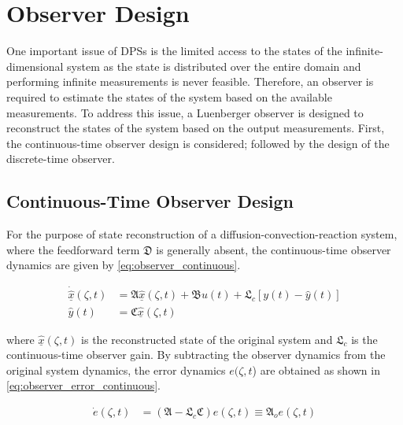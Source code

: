 \section{Observer Design}

One important issue of DPSs is the limited access to the states of the infinite-dimensional system as the state is distributed over the entire domain and performing infinite measurements is never feasible. Therefore, an observer is required to estimate the states of the system based on the available measurements. To address this issue, a Luenberger observer is designed to reconstruct the states of the system based on the output measurements. First, the continuous-time observer design is considered; followed by the design of the discrete-time observer.

\subsection{Continuous-Time Observer Design}

For the purpose of state reconstruction of a diffusion-convection-reaction system, where the feedforward term $\mathfrak{D}$ is generally absent, the continuous-time observer dynamics are given by \eqref{eq:observer_continuous}.

\begin{equation} \label{eq:observer_continuous}
    \begin{aligned}
        \dot{\underline{\hat{x}}}(\zeta, t) &= \mathfrak{A} \underline{\hat{x}}(\zeta, t) + \mathfrak{B} u(t) + \mathfrak{L}_c [y(t) - \hat{y}(t)] \\
        \hat{y}(t) &= \mathfrak{C} \underline{\hat{x}}(\zeta, t)
    \end{aligned}
\end{equation}

where $\underline{\hat{x}}(\zeta, t)$ is the reconstructed state of the original system and $\mathfrak{L}_c$ is the continuous-time observer gain. By subtracting the observer dynamics from the original system dynamics, the error dynamics $e(\zeta,t$) are obtained as shown in \eqref{eq:observer_error_continuous}.

\begin{equation} \label{eq:observer_error_continuous}
    \begin{aligned}
        \dot{e}(\zeta, t) &= (\mathfrak{A} - \mathfrak{L}_c \mathfrak{C}) e(\zeta, t) \equiv \mathfrak{A}_o e(\zeta,t) \\
    \end{aligned}
\end{equation}

